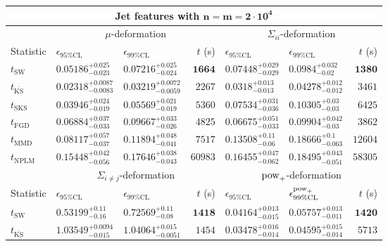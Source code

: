 \begin{tabular}{l|llr|llr}
	\toprule
	\multicolumn{7}{c}{{\bf Jet features with $\mathbf{n=m=2\cdot 10^{4}}$}} \\
	\toprule
	\multicolumn{1}{c}{} & \multicolumn{3}{c}{$\mu$-deformation} & \multicolumn{3}{c}{$\Sigma_{ii}$-deformation} \\
	Statistic & $\epsilon_{95\%\mathrm{CL}}$ & $\epsilon_{99\%\mathrm    {CL}}$ & $t$ (s) & $\epsilon_{95\%\mathrm{CL}}$ & $\epsilon_{99\%\mathrm{CL}}$ & $t$ (s) \\
	\midrule
	$t_{\mathrm{SW}}$ & $0.05186_{-0.023}^{+0.025}$ & $0.07216_{-0.024}^{+0.025}$ & ${\mathbf{1664}}$ & $0.07448_{-0.029}^{+0.029}$ & $0.0984_{-0.02}^{+0.032}$ & ${\mathbf{1380}}$ \\
	$t_{\overline{\mathrm{KS}}}$ & ${\mathbf{0.02318_{-0.0083}^{+0.0087}}}$ & ${\mathbf{0.03219_{-0.0059}^{+0.0072}}}$ & $2267$ & ${\mathbf{0.0318_{-0.013}^{+0.013}}}$ & ${\mathbf{0.04278_{-0.012}^{+0.012}}}$ & $3461$ \\
	$t_{\mathrm{SKS}}$ & $0.03946_{-0.019}^{+0.024}$ & $0.05569_{-0.019}^{+0.021}$ & $5360$ & $0.07534_{-0.036}^{+0.031}$ & $0.10305_{-0.03}^{+0.03}$ & $6425$ \\
	$t_{\mathrm{FGD}}$ & $0.06884_{-0.033}^{+0.037}$ & $0.09667_{-0.026}^{+0.033}$ & $4825$ & $0.06675_{-0.033}^{+0.051}$ & $0.09904_{-0.03}^{+0.042}$ & $3862$ \\
	$t_{\mathrm{MMD}}$ & $0.08117_{-0.037}^{+0.057}$ & $0.11894_{-0.041}^{+0.048}$ & $7517$ & $0.13508_{-0.06}^{+0.11}$ & $0.18666_{-0.063}^{+0.1}$ & $12604$ \\
\rowcolor{red!35}	$t_{\mathrm{NPLM}}$ & $0.15448_{-0.056}^{+0.042}$ & $0.17646_{-0.043}^{+0.038}$ & $60983$ & $0.16455_{-0.062}^{+0.047}$ & $0.18495_{-0.051}^{+0.043}$ & $58305$ \\
	\toprule
	\multicolumn{1}{c}{} & \multicolumn{3}{c}{$\Sigma_{i\neq j}$-deformation} & \multicolumn{3}{c}{$\rm{pow}_{+}$-deformation} \\
	Statistic & $\epsilon_{95\%\mathrm{CL}}$ & $\epsilon_{99\%\mathrm{CL}}$ & $t$ (s) & $\epsilon_{95\%\mathrm{CL}}$ & $\epsilon^{\rm   {pow}_{+}}_{99\%\mathrm{CL}}$ & $t$ (s) \\
	\midrule
	$t_{\mathrm{SW}}$ & $0.53199_{-0.16}^{+0.11}$ & $0.72569_{-0.08}^{+0.11}$ & ${\mathbf{1418}}$ & $0.04164_{-0.015}^{+0.013}$ & $0.05757_{-0.011}^{+0.013}$ & ${\mathbf{1420}}$ \\
	$t_{\overline{\mathrm{KS}}}$ & $1.03549_{-0.015}^{+0.0094}$ & $1.04064_{-0.0051}^{+0.015}$ & $1454$ & $0.03478_{-0.014}^{+0.016}$ & ${\mathbf{0.04595_{-0.014}^{+0.015}}}$ & $5713$ \\

\end{tabular}
